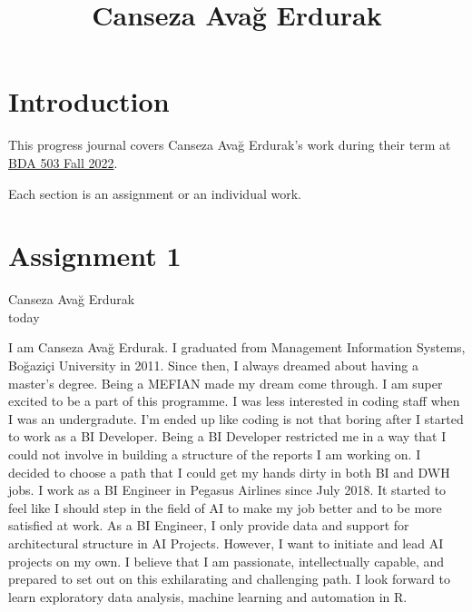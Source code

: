 \documentclass[
  letterpaper,
  DIV=11,
  numbers=noendperiod]{scrreprt}
\title{Canseza Avağ Erdurak}
\author{}
\date{}
\renewcommand*\contentsname{Table of contents}
\newcommand\contentsname{Table of contents}
\begin{document}
\maketitle
\ifdefined\Shaded\renewenvironment{Shaded}{\begin{tcolorbox}[breakable, enhanced, borderline west={3pt}{0pt}{shadecolor}, sharp corners, interior hidden, frame hidden, boxrule=0pt]}{\end{tcolorbox}}\fi

\renewcommand*\contentsname{Table of contents}
{
\hypersetup{linkcolor=}
\setcounter{tocdepth}{2}
\tableofcontents
}

\hypertarget{introduction}{%
\chapter*{Introduction}\label{introduction}}

This progress journal covers Canseza Avağ Erdurak's work during their
term at \href{https://mef-bda503.github.io/fall22/}{BDA 503 Fall 2022}.

Each section is an assignment or an individual work.


\hypertarget{assignment-1}{%
\chapter{Assignment 1}\label{assignment-1}}

Canseza Avağ Erdurak\\
today

\hfill\break

I am Canseza Avağ Erdurak. I graduated from Management Information
Systems, Boğaziçi University in 2011. Since then, I always dreamed about
having a master's degree. Being a MEFIAN made my dream come through. I
am super excited to be a part of this programme. I was less interested
in coding staff when I was an undergradute. I'm ended up like coding is
not that boring after I started to work as a BI Developer. Being a BI
Developer restricted me in a way that I could not involve in building a
structure of the reports I am working on. I decided to choose a path
that I could get my hands dirty in both BI and DWH jobs. I work as a BI
Engineer in Pegasus Airlines since July 2018. It started to feel like I
should step in the field of AI to make my job better and to be more
satisfied at work. As a BI Engineer, I only provide data and support for
architectural structure in AI Projects. However, I want to initiate and
lead AI projects on my own. I believe that I am passionate,
intellectually capable, and prepared to set out on this exhilarating and
challenging path. I look forward to learn exploratory data analysis,
machine learning and automation in R.
\end{document}
